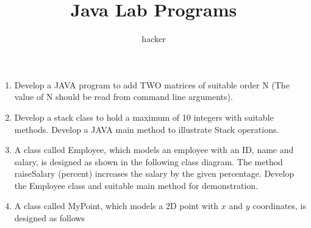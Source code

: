 \documentclass{article}
\author{hacker}
\title{Java Lab Programs}
\begin{document}
	\begin{enumerate}
		\item Develop a JAVA program to add TWO matrices of suitable order N (The value of N should be read from command line arguments).
		\item Develop a stack class to hold a maximum of 10 integers with suitable methods. Develop a JAVA main method to illustrate Stack operations.
		\item A class called Employee, which models an employee with an ID, name and salary, is designed as shown in the following class diagram. The method raiseSalary (percent) increases the salary by the given percentage. Develop the Employee class and suitable main method for demonstration.
		\item  A class called MyPoint, which models a 2D point with $x$ and $y$ coordinates, is designed as follows
	\end{enumerate}
\end{document}
